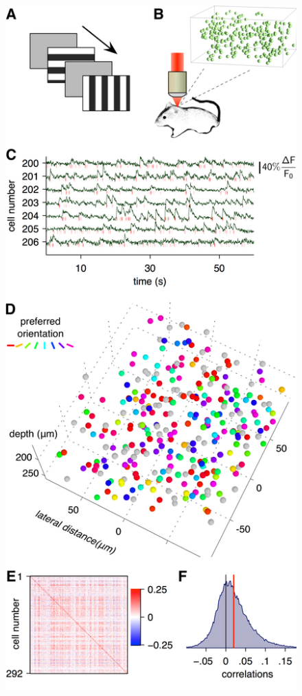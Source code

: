 \begin{figure}
\begin{fullpage}
        \begin{center}
        \includegraphics[height=\textheight]{./figures/Figure3.png}
        \end{center}
\end{fullpage}
\end{figure}
